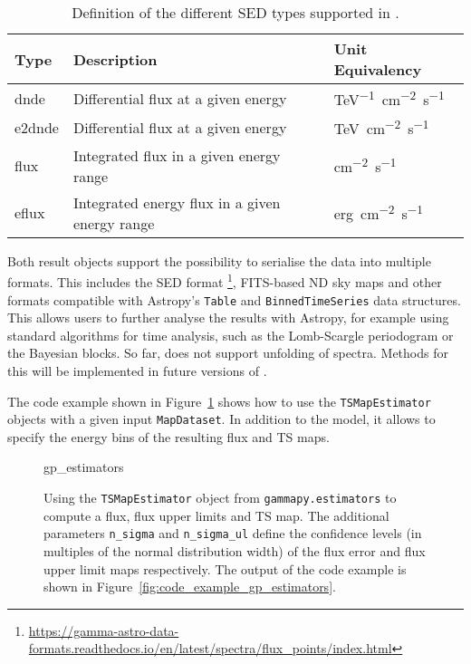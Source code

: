 \documentclass[longauth]{aa}
\newcommand{\code}[1]{\texttt{#1}}
\begin{document}
\begin{table*}
    \begin{center}
        \begin{tabular}{lll}
         \hline
         Type & Description & Unit Equivalency \\
         \hline
         dnde & Differential flux at a given energy & \si{TeV^{-1}.cm^{-2}.s^{-1}} \\
         e2dnde & Differential flux at a given energy  & \si{TeV.cm^{-2}.s^{-1}} \\
         flux & Integrated flux in a given energy range & \si{cm^{-2}.s^{-1}} \\
         eflux & Integrated energy flux in a given energy range & \si{erg.cm^{-2}.s^{-1}}\\
         \hline
        \end{tabular}
    \end{center}
    \caption{Definition of the different SED types supported in \gammapy.}
    \label{tab:sed_types}
\end{table*}


Both result objects support the possibility to serialise
the data into multiple formats. This includes the
\gadf SED format \footnote{\url{https://gamma-astro-data-formats.readthedocs.io/en/latest/spectra/flux_points/index.html}},
FITS-based ND sky maps and other formats compatible with Astropy's \code{Table} and
\code{BinnedTimeSeries} data structures. This allows
users to further analyse the results with Astropy, for example using
standard algorithms for time analysis, such as
the Lomb-Scargle periodogram or the Bayesian
blocks. So far, \gammapy does not support unfolding of \gammaray spectra.
Methods for this will be implemented in future versions of \gammapy.

The code example shown in Figure~\ref{fig*:minted:gp_estimators} shows how to use
the \code{TSMapEstimator} objects with a given input \code{MapDataset}.
In addition to the model, it allows to specify the energy
bins of the resulting flux and TS maps.


\begin{figure}
	\small
	{gp_estimators}
	\caption{Using the \code{TSMapEstimator} object from \code{gammapy.estimators} to compute a
	 flux, flux upper limits and TS map. The additional parameters \code{n\_sigma}
        and \code{n\_sigma\_ul} define the confidence levels (in multiples of the normal distribution width)
        of the flux error and flux upper limit maps respectively. The output
		of the code example is shown in Figure~\ref{fig:code_example_gp_estimators}.
    }
    \label{fig*:minted:gp_estimators}
\end{figure}
\end{document}
